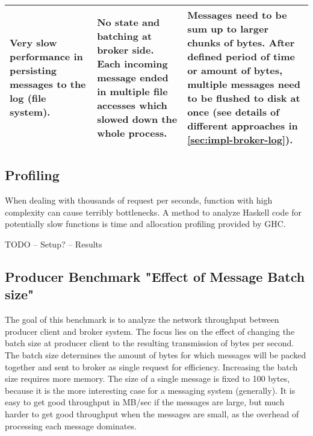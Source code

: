 \begin{table}[H]
\begin{tabular}{|p{4cm}|p{5cm}|p{6cm}|}
Very slow performance in persisting messages to the log (file system).                                 & No state and batching at broker side. Each incoming message ended in multiple file accesses which slowed down the whole process.                                                                                                                                & Messages need to be sum up to larger chunks of bytes. After defined period of time or amount of bytes, multiple messages need to be flushed to disk at once (see details of different approaches in \ref{sec:impl-broker-log}).                                                                                                                                      \\ \hline
\end{tabular}
\end{table}


\subsection{Profiling}
When dealing with thousands of request per seconds, function with high complexity
can cause terribly bottlenecks. A method to analyze Haskell code for
potentially slow functions is time and allocation profiling provided by GHC.

TODO
-- Setup?
-- Results 

\subsection{Producer Benchmark "Effect of Message Batch size"}

The goal of this benchmark is to analyze the network throughput between producer
client and broker system.  The focus lies on the effect of changing the batch
size at producer client to the resulting transmission of bytes per second. The
batch size determines the amount of bytes for which messages will be packed
together and sent to broker as single request for efficiency.  Increasing the
batch size requires more memory. The size of a single message is fixed to 100
bytes, because it is the more interesting case for a messaging system
(generally). It is easy to get good throughput in MB/sec if the messages are
large, but much harder to get good throughput when the messages are small, as
the overhead of processing each message dominates.

